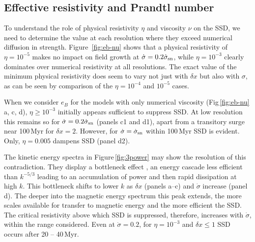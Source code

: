 \documentclass[preprint2]{aastex63}
\newcommand\SNr{\dot\sigma_{\rm sn}}
\newcommand\Ms{M_{\rm s}}
\newcommand\dx{ {\delta x}}
\begin{document}
{%
\subsection{{Effective resistivity and Prandtl number}} \label{sec:eta}

 {To understand the role of {physical} {resistivity} $\eta$
   and {viscosity} $\nu$ on the
   SSD,
 we need to determine the value at each resolution where they
   exceed numerical diffusion in strength.}
 Figure~\ref{fig:eb-nu} shows that
 {a physical resistivity of $\eta=10^{-5}$ makes no impact on field
   growth at $\dot\sigma = 0.2 \SNr$, while $\eta=10^{-3}$ clearly
   dominates over numerical resistivity at all resolutions.  The exact
   value of the minimum physical resistivity does seem to vary not
   just with $\dx$ but also with $\sigma$, as can be seen by
   comparison of the $\eta=10^{-4}$ and $10^{-5}$ cases. 
 }

 {When we consider $e_B$ for the models {with} only numerical
 viscosity
 (Fig\,\ref{fig:eb-nu} a, c, d), $\eta\geq10^{-3}$ initially appears
 sufficient to suppress SSD.
 At low resolution this remains so for $\dot\sigma=0.2\SNr$ (panels c1 and d1),
 apart from a transitory surge near 100\,Myr for $\dx=2$.
 However, for $\dot\sigma=\SNr$ within 100\,Myr SSD is evident.
 Only, $\eta=0.005$ dampens SSD (panel d2).}

 {The kinetic energy spectra in Figure\,\ref{fig:3power}} may
 show the resolution of this contradiction.
 They display a bottleneck effect \citep{Falkovich94,HBD03}, an energy cascade
 less efficient than $k^{-5/3}$
 leading to an accumulation of power and then rapid dissipation at high $k$.
 This bottleneck shifts to lower $k$ as $\dx$
 {(panels a--c) and $\dot\sigma$ increase (panel d).}
 {The deeper into the magnetic energy spectrum this peak extends, the more 
 scales available for transfer to magnetic energy and the more
 efficient the SSD.
 The critical resistivity above which SSD is suppressed, therefore, 
 increases with $\dot\sigma$, within the range considered. 
 Even at $\dot\sigma=0.2$, for $\eta=10^{-3}$ and $\dx\leq1$ SSD occurs after
 20 -- 40\,Myr.}

}
\end{document}
